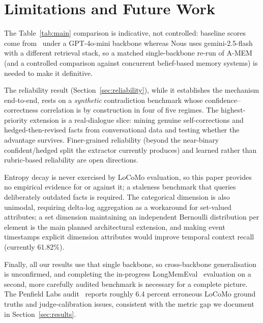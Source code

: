 \documentclass[11pt,a4paper,twocolumn]{article}
\begin{document}
\section{Limitations and Future Work}
\label{sec:limitations}

The Table~\ref{tab:main} comparison is indicative, not controlled: baseline
scores come from~\citet{xu2025amem} under a GPT-4o-mini backbone whereas Nous uses
gemini-2.5-flash with a different retrieval stack, so a matched single-backbone
re-run of A-MEM (and a controlled comparison against concurrent belief-based memory
systems) is needed to make it definitive.

The reliability result (Section~\ref{sec:reliability}), while it establishes the
mechanism end-to-end, rests on a \emph{synthetic} contradiction benchmark whose
confidence--correctness correlation is by construction in four of five regimes.
The highest-priority extension is a real-dialogue slice: mining genuine
self-corrections and hedged-then-revised facts from conversational data and
testing whether the advantage survives. Finer-grained reliability (beyond the
near-binary confident/hedged split the extractor currently produces) and
learned rather than rubric-based reliability are open directions.

Entropy decay is never exercised by LoCoMo evaluation, so this paper provides no
empirical evidence for or against it; a staleness benchmark that queries
deliberately outdated facts is required. The categorical dimension is also
unimodal, requiring delta-log aggregation as a workaround for set-valued
attributes; a set dimension maintaining an independent Bernoulli distribution
per element is the main planned architectural extension, and making event
timestamps explicit dimension attributes would improve temporal context recall
(currently 61.82\%).

Finally, all our results use that single backbone, so cross-backbone
generalisation is unconfirmed, and completing the in-progress
LongMemEval~\citep{wu2025longmemeval} evaluation on a second, more carefully
audited benchmark is necessary for a complete picture. The Penfield Labs
audit~\citep{locomo2025audit} reports roughly 6.4 percent erroneous LoCoMo ground
truths and judge-calibration issues, consistent with the metric gap we document in
Section~\ref{sec:results}.

\end{document}
